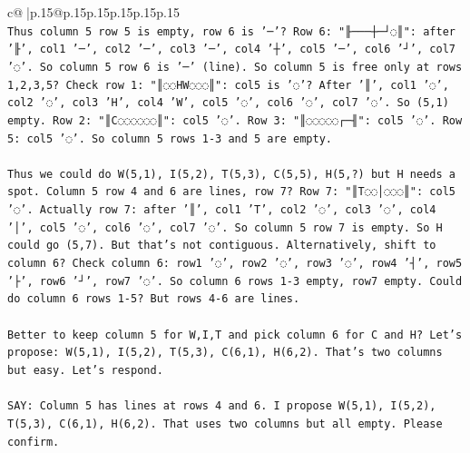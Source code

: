 \documentclass{article}
\begin{document}
{\begin{supertabular}{c@{$\;$}|p{.15\linewidth}@{}p{.15\linewidth}p{.15\linewidth}p{.15\linewidth}p{.15\linewidth}p{.15\linewidth}}
{{{\\ 
\texttt{Thus column 5 row 5 is empty, row 6 is '─'? Row 6: "╟───┼─┘◌║": after '╟', col1 '─', col2 '─', col3 '─', col4 '┼', col5 '─', col6 '┘', col7 '◌'. So column 5 row 6 is '─' (line). So column 5 is free only at rows 1,2,3,5? Check row 1: "║◌◌HW◌◌◌║": col5 is '◌'? After '║', col1 '◌', col2 '◌', col3 'H', col4 'W', col5 '◌', col6 '◌', col7 '◌'. So (5,1) empty. Row 2: "║C◌◌◌◌◌◌║": col5 '◌'. Row 3: "║◌◌◌◌◌┌─╢": col5 '◌'. Row 5: col5 '◌'. So column 5 rows 1{-}3 and 5 are empty.} \\
\\ 
\texttt{Thus we could do W(5,1), I(5,2), T(5,3), C(5,5), H(5,?) but H needs a spot. Column 5 row 4 and 6 are lines, row 7? Row 7: "║T◌◌│◌◌◌║": col5 '◌'. Actually row 7: after '║', col1 'T', col2 '◌', col3 '◌', col4 '│', col5 '◌', col6 '◌', col7 '◌'. So column 5 row 7 is empty. So H could go (5,7). But that's not contiguous. Alternatively, shift to column 6? Check column 6: row1 '◌', row2 '◌', row3 '◌', row4 '┤', row5 '├', row6 '┘', row7 '◌'. So column 6 rows 1{-}3 empty, row7 empty. Could do column 6 rows 1{-}5? But rows 4{-}6 are lines.} \\
\\ 
\texttt{Better to keep column 5 for W,I,T and pick column 6 for C and H? Let's propose: W(5,1), I(5,2), T(5,3), C(6,1), H(6,2). That's two columns but easy. Let's respond.} \\
\\ 
\texttt{SAY: Column 5 has lines at rows 4 and 6. I propose W(5,1), I(5,2), T(5,3), C(6,1), H(6,2). That uses two columns but all empty. Please confirm.} \\
            }
        }
    }
     \\ \\


\end{supertabular}}
\end{document}
